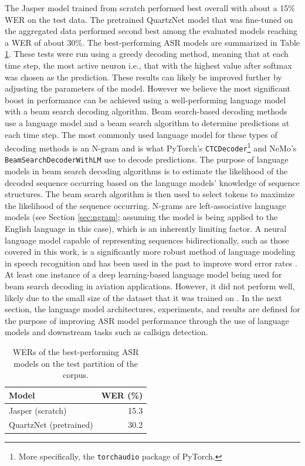 \documentclass[12pt]{article}
\begin{document}
The Jasper model trained from scratch performed best overall with about a 15\% WER on the test data. The pretrained QuartzNet model that was
fine-tuned on the aggregated data performed second best among the evaluated models reaching a WER of about 30\%. The best-performing ASR models are
summarized in Table \ref{tab:asr_performance}. These tests were run using a greedy decoding method, meaning that at each time step, the most active
neuron i.e., that with the highest value after softmax was chosen as the prediction. These results can likely be improved further by adjusting the
parameters of the model. However we believe the most significant boost in performance can be achieved using a well-performing language model with a
beam search decoding algorithm. Beam search-based decoding methods use a language model and a beam search algorithm to determine predictions at each
time step. The most commonly used language model for these types of decoding methods is an N-gram and is what PyTorch's
\lstinline|CTCDecoder|\footnote{More specifically, the \lstinline|torchaudio| package of PyTorch.} \cite{paszke_pytorch_2019} and NeMo's
\lstinline|BeamSearchDecoderWithLM| \cite{kuchaiev_nemo_2019} use to decode predictions. The purpose of language models in beam search decoding
algorithms is to estimate the likelihood of the decoded sequence occurring based on the language models' knowledge of sequence structures. The beam
search algorithm is then used to select tokens to maximize the likelihood of the
sequence occurring. N-grams are left-associative language models (see Section \ref{sec:ngram}; assuming the model is being applied to the English
language in this case), which is an inherently limiting factor. A neural language model capable of representing sequences bidirectionally, such as
those covered in this work, is a significantly more robust method of language modeling in speech recognition and has been
used in the past to improve word error rates \cite{kriman_quartznet_2020,majumdar_citrinet_2021}. At least one instance of a deep learning-based
language model being used for beam search decoding in aviation applications. However, it did not perform well, likely due to the small size of the
dataset that it was trained on \cite{pellegrini_airbus_2019}. In the next section, the language model architectures, experiments, and results are defined
for the purpose of improving ASR model performance through the use of language models and downstream tasks such as callsign detection.

\begin{table}[!t]
    \centering
    \begin{tabular}{l r}
        \toprule
        Model                  & WER (\%) \\
        \midrule
        Jasper (scratch)       & 15.3     \\
        QuartzNet (pretrained) & 30.2     \\
        \bottomrule
    \end{tabular}
    \caption{WERs of the best-performing ASR models on the test partition of the corpus.}
    \label{tab:asr_performance}
\end{table}
\end{document}
